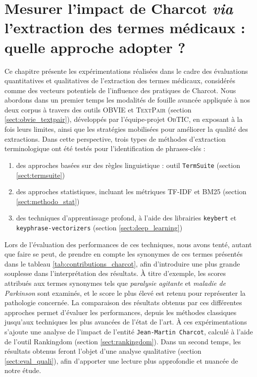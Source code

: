 \chapter{Mesurer l'impact de Charcot \textit{via} l'extraction des termes médicaux : quelle approche adopter ?}
\minitoc
\label{chap:resultats}

Ce chapitre présente les expérimentations réalisées dans le cadre des évaluations quantitatives et qualitatives de l'extraction des termes médicaux, considérés comme des vecteurs potentiels de l'influence des pratiques de Charcot. Nous abordons dans un premier temps les modalités de fouille avancée appliquée à nos deux corpus à travers des outils \textsc{OBVIE} et \textsc{TextPair} (section \ref{sect:obvie_textpair}), développés par l'équipe-projet \textsc{ObTIC}, en exposant à la fois leurs limites, ainsi que les stratégies mobilisées pour améliorer la qualité des extractions. Dans cette perspective, trois types de méthodes d'extraction terminologique ont été testés pour l'identification de phrases-clés :
\begin{enumerate}
	\item des approches basées sur des règles linguistique : outil \texttt{TermSuite} (section \ref{sect:termsuite})
	\item des approches statistiques, incluant les métriques \textsc{TF-IDF} et \textsc{BM25} (section \ref{sect:methodo_stat})
	\item des techniques d'apprentissage profond, à l'aide des librairies \texttt{keybert} et \texttt{keyphrase\allowbreak-vectorizers} (section \ref{sect:deep_learning})
\end{enumerate}


Lors de l'évaluation des performances de ces techniques, nous avons tenté, autant que faire se peut, de prendre en compte les synonymes de ces termes présentés dans le tableau \ref{tab:contributions_charcot}, afin d'introduire une plus grande souplesse dans l'interprétation des résultats. À titre d'exemple, les scores attribués aux termes synonymes tels que \textit{paralysie agitante} et \textit{maladie de Parkinson} sont examinés, et le score le plus élevé est retenu pour représenter la pathologie concernée. La comparaison des résultats obtenus par ces différentes approches permet d'évaluer les performances, depuis les méthodes classiques jusqu'aux techniques les plus avancées de l'état de l'art. À ces expérimentations s'ajoute une analyse de l'impact de l'entité \texttt{Jean-Martin Charcot}, calculé à l'aide de l'outil Rankingdom (section \ref{sect:rankingdom}).
Dans un second temps, les résultats obtenus feront l'objet d'une analyse qualitative (section \ref{sect:eval_quali}), afin d'apporter une lecture plus approfondie et nuancée de notre étude.
